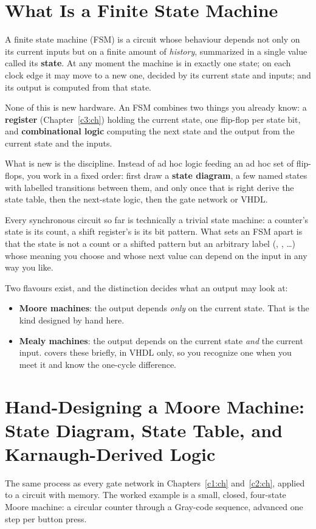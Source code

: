 
\section{What Is a Finite State Machine}
\label{c8:a1}
A finite state machine (FSM) is a circuit whose behaviour depends not only on its current inputs but
on a finite amount of \emph{history}, summarized in a single value called its \textbf{state}. At any
moment the machine is in exactly one state; on each clock edge it may move to a new one, decided by
its current state and inputs; and its output is computed from that state.

None of this is new hardware. An FSM combines two things you already know: a \textbf{register}
(Chapter~\ref{c3:ch}) holding the current state, one flip-flop per state bit, and
\textbf{combinational logic} computing the next state and the output from the current state and the
inputs.

What is new is the discipline. Instead of ad hoc logic feeding an ad hoc set of flip-flops, you work
in a fixed order: first draw a \textbf{state diagram}, a few named states with labelled transitions
between them, and only once that is right derive the state table, then the next-state logic, then
the gate network or VHDL.

Every synchronous circuit so far is technically a trivial state machine: a counter's state is its
count, a shift register's is its bit pattern. What sets an FSM apart is that the state is not a
count or a shifted pattern but an arbitrary label (, , \dots)
whose meaning you choose and whose next value can depend on the input in any way you like.

Two flavours exist, and the distinction decides what an output may look at:
\begin{itemize}
  \item \textbf{Moore machines}: the output depends \emph{only} on the current state. That is the
    kind designed by hand here.
  \item \textbf{Mealy machines}: the output depends on the current state \emph{and} the current
    input.  covers these briefly, in VHDL only, so you recognize one when you meet it
    and know the one-cycle difference.
\end{itemize}

\section[Hand-Designing a Moore Machine]{Hand-Designing a Moore Machine: State Diagram, State
Table, and Karnaugh-Derived Logic}
\label{c8:a2}
The same process as every gate network in Chapters~\ref{c1:ch} and~\ref{c2:ch}, applied to a
circuit with memory. The worked example is a small, closed, four-state Moore machine: a circular
counter through a Gray-code sequence, advanced one step per button press.

